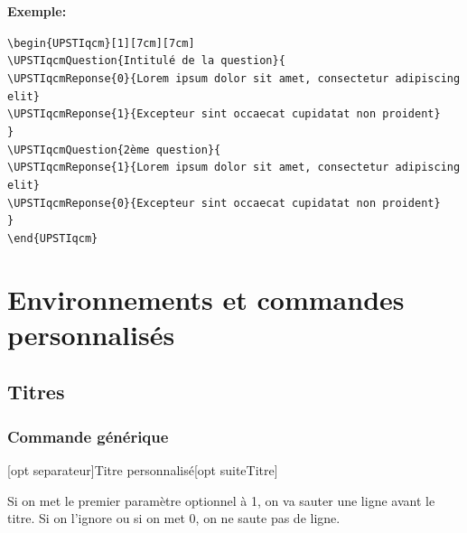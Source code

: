 \documentclass[11pt]{ltxdockit}[2010/09/26]
\newcommand{\ex}{\noindent \textbf{Exemple:}\quad}
\begin{document}
\begin{UPSTIqcm}
\end{UPSTIqcm}

\vspace{1em}
\ex

\noindent \verb!\begin{UPSTIqcm}[1][7cm][7cm]!\\
\verb!\UPSTIqcmQuestion{Intitulé de la question}{!\\
\verb!\UPSTIqcmReponse{0}{Lorem ipsum dolor sit amet, consectetur adipiscing elit}!\\
\verb!\UPSTIqcmReponse{1}{Excepteur sint occaecat cupidatat non proident}!\\
\verb!}!\\
\verb!\UPSTIqcmQuestion{2ème question}{!\\
\verb!\UPSTIqcmReponse{1}{Lorem ipsum dolor sit amet, consectetur adipiscing elit}!\\
\verb!\UPSTIqcmReponse{0}{Excepteur sint occaecat cupidatat non proident}!\\
\verb!}!\\
\verb!\end{UPSTIqcm}!

\begin{UPSTIqcm}[1][7cm][7cm]
\end{UPSTIqcm}

\section{Environnements et commandes personnalisés}
\subsection{Titres}
\subsubsection{Commande générique}
\begin{ltxsyntax}
[opt separateur]{Titre personnalisé}[opt suiteTitre]
\end{ltxsyntax}
Si on met le premier paramètre optionnel à 1, on va sauter une ligne avant le titre. Si on l'ignore ou si on met 0, on ne saute pas de ligne.
\end{document}
